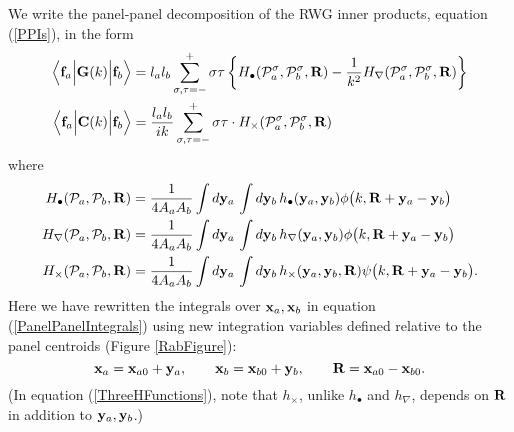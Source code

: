 \documentclass[dvips,letterpaper]{article}
\begin{document}
We write the panel-panel decomposition of the RWG inner products,
equation (\ref{PPIs}), in the form
\begin{subequations}
\begin{align}
 \Big\langle \mathbf{f}_a \Big| \mathbf{G}(k) \Big | \mathbf{f}_b \Big \rangle
&= l_a l_b \sum_{\sigma, \tau=-}^+
   \sigma \tau
   \left\{ H_\bullet(\mathcal{P}_a^\sigma, \mathcal{P}_b^\sigma, \mathbf{R}) 
           -\frac{1}{k^2} H_\nabla(\mathcal{P}_a^\sigma, \mathcal{P}_b^\sigma, \mathbf{R}) 
   \right\}
\\
 \Big\langle \mathbf{f}_a \Big| \mathbf{C}(k) \Big | \mathbf{f}_b \Big \rangle
&= 
   \frac{l_a l_b }{ik}
   \sum_{\sigma, \tau=-}^+
   \sigma \tau \cdot 
   H_\times(\mathcal{P}_a^\sigma, \mathcal{P}_b^\sigma, \mathbf{R}) 
\end{align}
\end{subequations}
where
\begin{subequations}
\begin{align}
 H_\bullet(\mathcal{P}_a, \mathcal{P}_b, \mathbf{R}) 
   &=\frac{1}{4A_a A_b} 
     \int d\mathbf{y}_a \, \int d\mathbf{y}_b \,
     h_\bullet(\mathbf{y}_a, \mathbf{y}_b)
     \phi\big(k, \mathbf{R} + \mathbf{y}_{a} - \mathbf{y}_{b} \big) 
\\
 H_\nabla(\mathcal{P}_a, \mathcal{P}_b, \mathbf{R}) 
   &=\frac{1}{4A_a A_b} 
     \int d\mathbf{y}_a \, \int d\mathbf{y}_b \,
     h_\nabla(\mathbf{y}_a, \mathbf{y}_b)
     \phi\big(k, \mathbf{R} + \mathbf{y}_{a} - \mathbf{y}_{b} \big) 
\\
 H_\times(\mathcal{P}_a, \mathcal{P}_b, \mathbf{R})
   &=\frac{1}{4A_a A_b}
      \int d\mathbf{y}_a \, \int d\mathbf{y}_b \,
      h_\times(\mathbf{y}_a, \mathbf{y}_b, \mathbf{R})
      \psi\big(k, \mathbf{R} + \mathbf{y}_{a} - \mathbf{y}_{b} \big). 
\end{align}
\label{ThreeHFunctions}
\end{subequations}
Here we have rewritten the integrals over $\mathbf{x}_a, \mathbf{x}_b$ in 
equation (\ref{PanelPanelIntegrals}) using new integration variables
defined relative to the panel centroids (Figure \ref{RabFigure}):
$$\mathbf{x}_a=\mathbf{x}_{a0} + \mathbf{y}_a, 
  \qquad 
  \mathbf{x}_b=\mathbf{x}_{b0} + \mathbf{y}_b, 
  \qquad
  \mathbf{R} = \mathbf{x}_{a0} - \mathbf{x}_{b0}.
$$
(In equation (\ref{ThreeHFunctions}), note that $h_\times$, 
unlike $h_\bullet$ and $h_\nabla$, depends on $\mathbf{R}$ in 
addition to $\mathbf{y}_a, \mathbf{y}_b$.)
\end{document}
